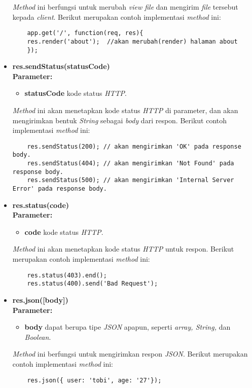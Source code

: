 \begin{itemize}
	\textit{Method} ini berfungsi untuk merubah \textit{view file} dan mengirim \textit{file} tersebut kepada \textit{client}. Berikut merupakan contoh implementasi \textit{method} ini:
	\begin{lstlisting}
	app.get('/', function(req, res){
	res.render('about');  //akan merubah(render) halaman about 
	});
	\end{lstlisting}
	
	\item \textbf{res.sendStatus(statusCode)} \\ \textbf{Parameter:} 
	\begin{itemize}
		\item \textbf{statusCode} kode status \textit{HTTP}.
	\end{itemize}
	
	\textit{Method} ini akan menetapkan kode status \textit{HTTP} di parameter, dan akan mengirimkan bentuk \textit{String} sebagai \textit{body} dari respon. Berikut contoh implementasi \textit{method} ini:
	\begin{lstlisting}
	res.sendStatus(200); // akan mengirimkan 'OK' pada response body.
	res.sendStatus(404); // akan mengirimkan 'Not Found' pada response body.
	res.sendStatus(500); // akan mengirimkan 'Internal Server Error' pada response body.
	\end{lstlisting}
	
	\item \textbf{res.status(code)} \\ \textbf{Parameter:}
	\begin{itemize}
		\item \textbf{code} kode status \textit{HTTP}.
	\end{itemize}
	
	\textit{Method} ini akan menetapkan kode status \textit{HTTP} untuk respon. Berikut merupakan contoh implementasi \textit{method} ini:
	\begin{lstlisting}
	res.status(403).end();
	res.status(400).send('Bad Request');
	\end{lstlisting}
	
	\item \textbf{res.json([body])} \\ \textbf{Parameter:}
	\begin{itemize}
		\item \textbf{body} dapat berupa tipe \textit{JSON} apapun, seperti \textit{array, String,} dan \textit{Boolean}.
	\end{itemize}
	
	\textit{Method} ini berfungsi untuk mengirimkan respon \textit{JSON}. Berikut merupakan contoh implementasi \textit{method} ini:
	\begin{lstlisting}
	res.json({ user: 'tobi', age: '27'});
	\end{lstlisting}
	
\end{itemize}

